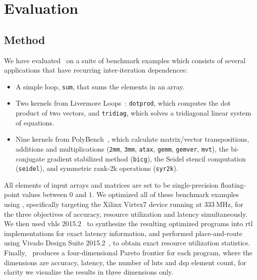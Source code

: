 \section{Evaluation}
\label{lo:sec:results}

\newcommand\redcircle{%
\begin{tikzpicture}\draw[red] (0,0) circle (1mm);\end{tikzpicture}}


\subsection{Method}
\label{lo:sub:method}

We have evaluated \soap~on a suite of benchmark examples which consists of
several applications that have recurring inter-iteration dependences:
\begin{itemize}

\item A simple loop, \verb|sum|, that sums the elements in an array.

\item Two kernels from Livermore Loops~\cite{livermore}: \verb|dotprod|, which
computes the dot product of two vectors, and \verb|tridiag|, which solves a
tridiagonal linear system of equations.

\item Nine kernels from PolyBench~\cite{polybench}, which calculate
matrix/vector transpositions, additions and multiplications (\verb|2mm|,
\verb|3mm|, \verb|atax|, \verb|gemm|, \verb|gemver|, \verb|mvt|), the
bi-conjugate gradient stabilized method (\verb|bicg|), the Seidel stencil
computation (\verb|seidel|), and symmetric rank-2k operations
(\verb|syr2k|).

\end{itemize}

All elements of input arrays and matrices are set to be single-precision
floating-point values between $0$ and $1$.  We optimized all of these
benchmark examples using \soap, specifically targeting the Xilinx Virtex7
device running at $333~\mathrm{MHz}$, for the three objectives of accuracy,
resource utilization and latency simultaneously.  We then used \gls{vhls}
2015.2~\cite{vivado_hls} to synthesize the resulting optimized programs
into \gls{rtl} implementations for exact latency information, and performed
place-and-route using Vivado Design Suite 2015.2~\cite{vivado_ds}, to
obtain exact resource utilization statistics.  Finally, \soap~produces a
four-dimensional Pareto frontier for each program, where the dimensions are
accuracy, latency, the number of \glspl{lut} and \gls{dsp} element count, for
clarity we visualize the results in three dimensions only.

